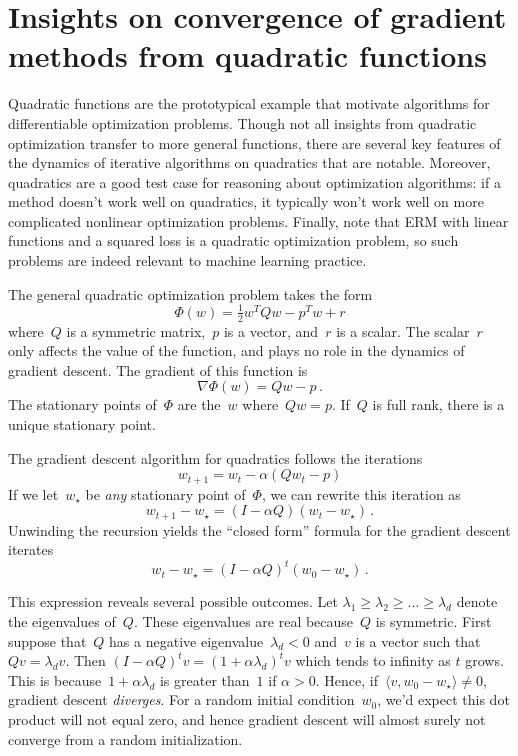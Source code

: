 \documentclass{tufte-book}
\begin{document}
\hypertarget{insights-on-convergence-of-gradient-methods-from-quadratic-functions}{%
\section{Insights on convergence of gradient methods from quadratic
functions}\label{insights-on-convergence-of-gradient-methods-from-quadratic-functions}}

Quadratic functions are the prototypical example that motivate
algorithms for differentiable optimization problems. Though not all
insights from quadratic optimization transfer to more general functions,
there are several key features of the dynamics of iterative algorithms
on quadratics that are notable. Moreover, quadratics are a good test
case for reasoning about optimization algorithms: if a method doesn't
work well on quadratics, it typically won't work well on more
complicated nonlinear optimization problems. Finally, note that ERM with
linear functions and a squared loss is a quadratic optimization problem,
so such problems are indeed relevant to machine learning practice.

The general quadratic optimization problem takes the form \[
    \Phi(w) = \tfrac{1}{2} w^T Q w - p^T w + r
\] where~\(Q\) is a symmetric matrix,~\(p\) is a vector, and~\(r\) is a
scalar. The scalar~\(r\) only affects the value of the function, and
plays no role in the dynamics of gradient descent. The gradient of this
function is \[
    \nabla \Phi(w) = Qw - p\,.
\] The stationary points of~\(\Phi\) are the~\(w\) where~\(Qw = p\).
If~\(Q\) is full rank, there is a unique stationary point.

The gradient descent algorithm for quadratics follows the iterations \[
    w_{t+1} = w_t - \alpha (Qw_t - p)
\] If we let~\(w_\star\) be \emph{any} stationary point of~\(\Phi\), we
can rewrite this iteration as \[
    w_{t+1}-w_\star = (I-\alpha Q) (w_t - w_\star)\,.
\] Unwinding the recursion yields the ``closed form'' formula for the
gradient descent iterates \[
    w_{t}-w_\star = (I-\alpha Q)^t (w_0 - w_\star)\,.
\]

This expression reveals several possible outcomes. Let
\(\lambda_1 \geq \lambda_2 \geq \ldots \geq \lambda_d\) denote the
eigenvalues of~\(Q\). These eigenvalues are real because~\(Q\) is
symmetric. First suppose that~\(Q\) has a negative
eigenvalue~\(\lambda_d<0\) and~\(v\) is a vector such
that~\(Qv = \lambda_d v\). Then
\((I-\alpha Q)^t v = (1+\alpha \lambda_d)^t v\) which tends to infinity
as \(t\) grows. This is because~\(1+\alpha \lambda_d\) is greater
than~\(1\) if \(\alpha>0\). Hence,
if~\(\langle v, w_0-w_\star \rangle \neq 0\), gradient descent
\emph{diverges}. For a random initial condition~\(w_0\), we'd expect
this dot product will not equal zero, and hence gradient descent will
almost surely not converge from a random initialization.
\end{document}
